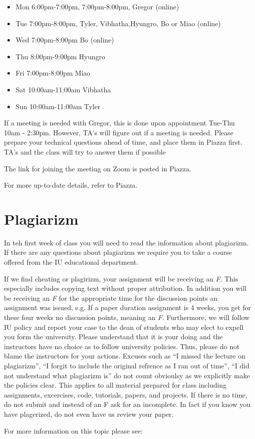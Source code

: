 \begin{itemize}
\item Mon 6:00pm-7:00pm, 7:00pm-8:00pm, Gregor (online)
\item Tue 7:00pm-8:00pm, Tyler, Vibhatha,Hyungro, Bo or Miao (online)
\item Wed 7:00pm-8:00pm Bo (online)
\item Thu 8:00pm-9:00pm Hyungro
\item Fri 7:00pm-8:00pm Miao
\item Sat 10:00am-11:00am Vibhatha 
\item Sun 10:00am-11:00am Tyler
\end{itemize}


If a meeting is needed with Gregor, this is done upon appointment
Tue-Thu 10am - 2:30pm. However, TA's will figure out if a meeting is needed.
Please prepare your technical questions ahead of time, and place them in Piazza
first. TA's and the class will try to answer them if possible

The link for joining the meeting on Zoom is posted in Piazza.



For more up-to-date details, refer to Piazza.

\section{Plagiarizm}

In teh first week of class you will need to read the information about
plagiarizm. If there are any questions about plagiarizm we require you
to take a course offered from the IU educational department.

\begin{WARNING}
  If we find cheating or plagirizm, your assignment will be receiving
  an {\em F}. This especially includes copying text without proper
  attribution. In addition you will be receiving an {\em F} for the
  appropriate time for the discussion points an assignment was issued,
  e.g. If a paper duration assignment is 4 weeks, you get for these
  four weeks no discussion points, meaning an {\em F}. Furthermore, we
  will follow IU policy and report your case to the dean of students
  who may elect to expell you form the university. Please understand
  that it is your doing and the instructors have no choice as to
  follow university policies. Thus, please do not blame the
  instructors for your actions. Excuses such as ``I missed the lecture
  on plagiarizm'', ``I forgit to include the original refrence as I
  ran out of time'', ``I did not understand what plagiarizm is'' do
  not count obvioulsy as we explicitly make the policies clear. This
  applies to all material prepared for class including assignments,
  excercises, code, tutorials, papers, and projects. If there is no
  time, do not submit and instead of an F ask for an incomplete. In
  fact if you know you have plagerized, do not even have us review
  your paper. 
\end{WARNING}

For more information on this topic please see:

